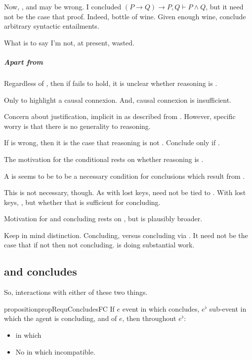 \begin{note}
  Now, , and  may be wrong.
  I concluded \((P \rightarrow Q) \rightarrow P, Q \vdash P \land Q\), but it need not be the case that proof.
  Indeed, bottle of wine.
  Given enough wine, conclude arbitrary syntactic entailments.

  What is to say I'm not, at present, wasted.
\end{note}

\subparagraph{Apart from }

\begin{note}
  Regardless of , then if \requ{} fails to hold, it is unclear whether reasoning is \sR{}.

  Only to highlight a causal connexion.
  And, causal connexion is insufficient.

  Concern about justification, implicit in  as described from .
  However, specific worry is that there is no generality to reasoning.

  If  is wrong, then it is the case that reasoning is not \sR{}.
  Conclude only if \sR{}.
\end{note}

\begin{note}
  The motivation for the conditional rests on whether reasoning is \sR{}.

  A \requ{} is seems to be to be a necessary condition for conclusions which result from \sR{}.

  This is not necessary, though.
  As with lost keys, \requ{} need not be tied to \sR{}.
  With lost keys, \sR{}, but whether that is sufficient for concluding.

  Motivation for  and concluding rests on \sR{}, but is plausibly broader.
\end{note}

\begin{note}
  Keep in mind distinction.
  Concluding, versus concluding via .
  It need not be the case that if not  then not concluding.
  \requ{} is doing substantial work.
\end{note}

\subsection{\requ{} and concludes}
\label{sec:requ-concludes}

\begin{note}
  So, interactions with either of these two things.

  \begin{restatable}{proposition}{propRequConcludesFC}
    If \(e\) event in which \vAgent{} concludes, \(e^{\flat}\) sub-event in which the agent is concluding, and \requ{} of \(e\), then throughout \(e^{\flat}\):
    \begin{itemize}
    \item
      \pevent{} in which \vAgent{}
    \item
      No \pevent{} in which incompatible.
    \end{itemize}
  \end{restatable}
\end{note}

